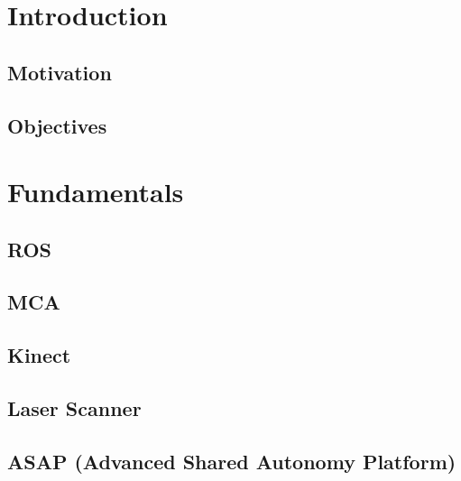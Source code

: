 \chapter{Introduction}
\section{Motivation}

\section{Objectives}

\chapter{Fundamentals}
\section{ROS}
\section{MCA}
\section{Kinect}
\section{Laser Scanner}
\section{ASAP (Advanced Shared Autonomy Platform)}
